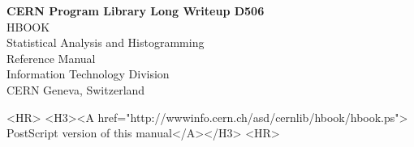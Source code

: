 \def\Ptitle#1{\special{ps: /Printstring (#1) def}
                       \epsfbox{../cnasall/cnastit.eps}}
\begin{htmlonly}
\begin{center}{\Large\bf CERN Program Library Long Writeup D506}\\[1cm]
{\Huge HBOOK}\\[2cm]
{\Huge Statistical Analysis and Histogramming}\\[2cm]
{\Huge Reference Manual}\\[5cm]
{\Large Information Technology Division}\\[2cm]
{\Large CERN Geneva, Switzerland}
\end{center}

\begin{rawhtml}
<HR>
<H3><A href="http://wwwinfo.cern.ch/asd/cernlib/hbook/hbook.ps">
PostScript version of this manual</A></H3>
<HR>
\end{rawhtml}
\end{htmlonly}


